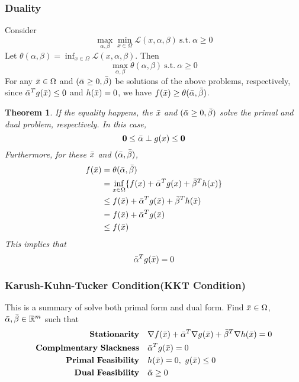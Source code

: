 \documentclass{article}
\newtheorem{theorem}{Theorem}[section]
\begin{document}
            \subsubsection{Duality}
                Consider
                \[
                    \max_{\alpha,\beta}\min_{x\in\Omega}\mathcal{L}(x,\alpha,\beta) \mathrm{~s.t.~}\alpha\geq0
                \]
                Let $\theta(\alpha,\beta)=\inf_{x\in\Omega}\mathcal{L}(x,\alpha,\beta)$. Then
                \[
                    \max_{\alpha,\beta}\theta(\alpha,\beta)\mathrm{~s.t.~}\alpha\geq 0
                \]
                For any $\Bar{x}\in\Omega$ and $(\Bar{\alpha}\geq0,\Bar{\beta})$ be solutions of the above problems, respectively, since $\Bar{\alpha}^T g(\Bar{x})\leq 0$ and $h(\Bar{x})=0$, we have $f(\Bar{x})\geq \theta(\Bar{\alpha},\Bar{\beta})$. 
                \begin{theorem}
                    If the equality happens, the $\Bar{x}$ and $(\Bar{\alpha}\geq 0, \Bar{\beta})$ solve the primal and dual problem, respectively. In this case,
                    \[
                        \mathbf{0}\leq \Bar{\alpha} \perp g(x)\leq\mathbf{0}
                    \]
                    Furthermore, for these $\Bar{x}$ and $(\Bar{\alpha}, \Bar{\beta})$,
                    \begin{align*}
                        f(\Bar{x}) &= \theta(\Bar{\alpha},\Bar{\beta})\\
                                   &= \inf_{x \in \Omega}\{f(x) + \Bar{\alpha}^T g(x) + \Bar{\beta}^T h(x)\}\\
                                   &\leq f(\Bar{x}) + \Bar{\alpha}^T g(\Bar{x}) + \Bar{\beta}^T h(\Bar{x})\\
                                   &= f(\Bar{x}) + \Bar{\alpha}^T g(\Bar{x})\\
                                   &\leq f(\Bar{x})
                    \end{align*}
                    This implies that 
                    \[
                        \Bar{\alpha}^T g(\Bar{x}) = 0
                    \]
                \end{theorem}
            
            \subsubsection{Karush-Kuhn-Tucker Condition(KKT Condition)}
                This is a summary of solve both primal form and dual form. Find $\Bar{x}\in\Omega$, $\Bar{\alpha},\Bar{\beta}\in\mathbb{R}^m$ such that
                \begin{align*}
                    \mathbf{Stationarity \quad} & \nabla f(\Bar{x}) + \Bar{\alpha}^T\nabla g(\Bar{x}) + \Bar{\beta}^T\nabla h(\Bar{x})=0\\
                    \mathbf{Complmentary~Slackness \quad} & \Bar{\alpha}^T g(\Bar{x})=0\\
                    \mathbf{Primal~Feasibility \quad} & h(\Bar{x})=0,~g(\Bar{x})\leq 0\\
                    \mathbf{Dual~Feasibility \quad} & \Bar{\alpha}\geq 0
                \end{align*}
                
\end{document}

